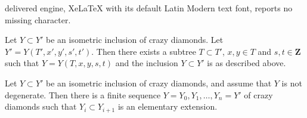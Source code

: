 \documentclass[10pt,a4paper]{amsart}
\newcommand{\ZZ}{\mathbf{Z}}                          %
\begin{document}
delivered engine, XeLaTeX with its default Latin Modern text font, reports no missing character.
\begin{lemma}\label{lem:extstd}
Let $Y\subset Y'$ be an isometric inclusion of crazy diamonds. Let $Y'=Y(T',x',y',s',t')$. Then there exists a subtree $T\subset T'$, $x,y\in T$ and $s,t\in \ZZ$ such that $Y=Y(T,x,y,s,t)$ and the inclusion $Y\subset Y'$ is as described above.

\end{lemma}

\begin{lemma}\label{lem:seqextensions}
Let $Y\subset Y'$ be an isometric inclusion of crazy diamonds, and assume that $Y$ is not degenerate. Then there is a finite sequence $Y=Y_0,Y_1,\dots,Y_n=Y'$ of crazy diamonds such that $Y_i\subset Y_{i+1}$ is an elementary extension. %
\end{lemma}
\end{document}
